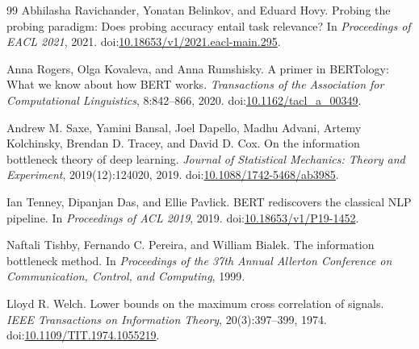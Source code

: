 \begin{thebibliography}{99}
Abhilasha Ravichander, Yonatan Belinkov, and Eduard Hovy.
\newblock Probing the probing paradigm: Does probing accuracy entail task relevance?
\newblock In \emph{Proceedings of EACL 2021}, 2021.
\newblock doi:\href{https://doi.org/10.18653/v1/2021.eacl-main.295}{10.18653/v1/2021.eacl-main.295}.

Anna Rogers, Olga Kovaleva, and Anna Rumshisky.
\newblock A primer in BERTology: What we know about how BERT works.
\newblock \emph{Transactions of the Association for Computational Linguistics}, 8:842--866, 2020.
\newblock doi:\href{https://doi.org/10.1162/tacl_a_00349}{10.1162/tacl\_a\_00349}.

Andrew M. Saxe, Yamini Bansal, Joel Dapello, Madhu Advani, Artemy Kolchinsky, Brendan D. Tracey, and David D. Cox.
\newblock On the information bottleneck theory of deep learning.
\newblock \emph{Journal of Statistical Mechanics: Theory and Experiment}, 2019(12):124020, 2019.
\newblock doi:\href{https://doi.org/10.1088/1742-5468/ab3985}{10.1088/1742-5468/ab3985}.

Ian Tenney, Dipanjan Das, and Ellie Pavlick.
\newblock BERT rediscovers the classical NLP pipeline.
\newblock In \emph{Proceedings of ACL 2019}, 2019.
\newblock doi:\href{https://doi.org/10.18653/v1/P19-1452}{10.18653/v1/P19-1452}.

Naftali Tishby, Fernando C. Pereira, and William Bialek.
\newblock The information bottleneck method.
\newblock In \emph{Proceedings of the 37th Annual Allerton Conference on Communication, Control, and Computing}, 1999.

Lloyd R. Welch.
\newblock Lower bounds on the maximum cross correlation of signals.
\newblock \emph{IEEE Transactions on Information Theory}, 20(3):397--399, 1974.
\newblock doi:\href{https://doi.org/10.1109/TIT.1974.1055219}{10.1109/TIT.1974.1055219}.

\end{thebibliography}

